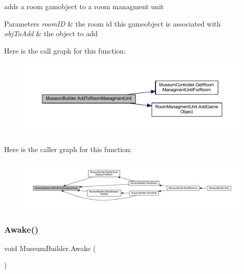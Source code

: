 adds a room gamobject to a room managment unit 


\begin{DoxyParams}{Parameters}
{\em room\+ID} & the room id this gameobject is associated with\\
\hline
{\em obj\+To\+Add} & the object to add\\
\hline
\end{DoxyParams}
Here is the call graph for this function\+:\nopagebreak
\begin{figure}[H]
\begin{center}
\leavevmode
\includegraphics[width=350pt]{class_museum_builder_ad1991ecd1258a2eb6d020d3c429ad9c8_cgraph}
\end{center}
\end{figure}
Here is the caller graph for this function\+:
\nopagebreak
\begin{figure}[H]
\begin{center}
\leavevmode
\includegraphics[width=350pt]{class_museum_builder_ad1991ecd1258a2eb6d020d3c429ad9c8_icgraph}
\end{center}
\end{figure}
\mbox{\label{class_museum_builder_a846546ea2e9bf91bba2a166dc2b01e2d}} 
\subsubsection{\texorpdfstring{Awake()}{Awake()}}
{\footnotesize\ttfamily void Museum\+Builder.\+Awake (\begin{DoxyParamCaption}{ }\end{DoxyParamCaption})\hspace{0.3cm}{\ttfamily [private]}}

